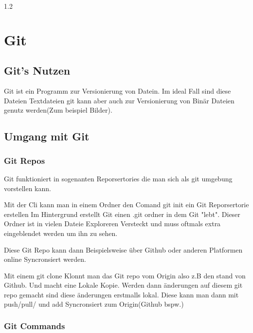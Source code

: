 \documentclass{article}
\newcommand{\Zeilenabstand}{1.2}
\newcommand{\absatz}{5mm}
\begin{document}
\begin{spacing}{\Zeilenabstand}
\section{Git}

\subsection{Git's Nutzen}

Git ist ein Programm zur Versionierung von Datein. Im ideal Fall sind diese Dateien
Textdateien git kann aber auch zur Versionierung von Binär Dateien genutz werden(Zum beispiel Bilder).

\subsection{Umgang mit Git}

\subsubsection{Git Repos}

Git funktioniert in sogenanten Reporsertories die man sich als git umgebung vorstellen kann.

\vspace{\absatz}

Mit der Cli kann man in einem Ordner den Comand {\color{red} git init} ein Git Reporsertorie erstellen
Im Hintergrund erstellt Git einen .git ordner in dem Git "lebt". Dieser Ordner ist in vielen 
Dateie Exploreren Versteckt und muss oftmals extra eingeblendet werden um ihn zu sehen.


\vspace{\absatz}


Diese Git Repo kann dann Beispielsweise über Github oder anderen Platformen online 
Syncronsiert werden. 

\vspace{\absatz}

Mit einem {\color{red}git clone} Klonnt man das Git repo vom Origin also z.B den stand von Github. Und 
macht eine Lokale Kopie. Werden dann änderungen auf diesem git repo gemacht sind diese änderungen
erstmalls lokal. Diese kann man dann mit push/pull/ und add Syncronsiert zum Origin(Github bspw.)






\subsubsection{Git Commands}


\end{spacing}
\end{document}
